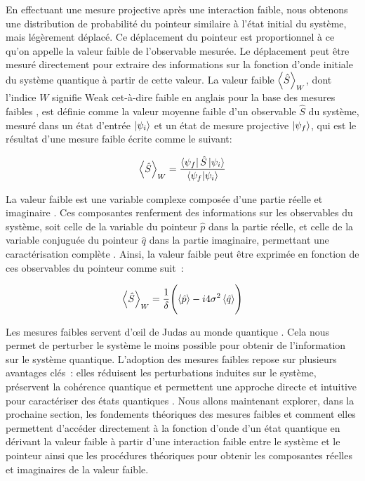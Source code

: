 \begin{onehalfspace}
    \noindent En effectuant une mesure projective après une interaction
    faible, nous obtenons une distribution de probabilité du pointeur similaire
    à l'état initial du système, mais légèrement déplacé.
    Ce déplacement du pointeur est proportionnel à ce qu'on appelle la 
    \guillemetleft \space valeur faible \guillemetright \space de l'observable mesurée.
    Le déplacement peut être mesuré directement pour extraire
    des informations sur la fonction d'onde initiale du système quantique
    à partir de cette valeur. La valeur faible $\expval{\hat{S}}_W$,
    dont l'indice $W$ signifie \guillemetleft Weak \guillemetright \space 
    cet-à-dire faible en anglais pour la base des
    mesures faibles \cite{Lundeen_Resch}, est définie
    comme la valeur moyenne faible d’un observable $\hat{S}$ du système,
    mesuré dans un état d’entrée $\ket{\psi_i}$ et un état de mesure
    projective $\ket{\psi_f}$, qui est le résultat d’une mesure faible écrite comme le suivant:


    \begin{equation}
        \expval{\hat{S}}_W = \frac{\bra{\psi_f}\hat{S}\ket{\psi_i}}{\bra{\psi_f}\ket{\psi_i}}        
    \end{equation}
        
    
    \noindent La valeur faible est une variable complexe composée d'une partie
    réelle et imaginaire \cite{Aharonov,Lundeen_Resch}. Ces composantes renferment des
    informations sur les observables du système, soit celle de la variable du pointeur $\hat{p}$ dans la partie réelle,
    et celle de la variable conjuguée du pointeur $\hat{q}$ dans la partie imaginaire,
    permettant une caractérisation complète \cite{Lundeen_Bamber}.
    Ainsi, la valeur faible peut être exprimée en fonction de ces 
    observables du pointeur comme suit :

    \begin{equation}
        \expval{\hat{S}}_W = \frac{1}{\delta}\Biggl( \expval{\hat{p}} - i4\sigma^2 \expval{\hat{q}} \Biggr)\label{eq:weakvalue_components}
    \end{equation}

    \noindent Les mesures faibles servent d’œil de Judas au monde 
    quantique \cite{Peephole}. Cela nous permet de perturber le système le 
    moins possible pour obtenir de l’information sur le système quantique. 
    L’adoption des mesures faibles repose sur plusieurs avantages clés : 
    elles réduisent les perturbations induites sur le système, préservent 
    la cohérence quantique et permettent une approche directe et 
    intuitive pour caractériser des états quantiques \cite{ApplicationWeak}.
    Nous allons maintenant explorer, dans la prochaine section, les fondements théoriques des 
    mesures faibles et comment elles permettent d’accéder directement à 
    la fonction d’onde d’un état quantique en dérivant la valeur faible
    à partir d’une interaction faible entre le système et le pointeur ainsi
    que les procédures théoriques pour obtenir les composantes réelles et
    imaginaires de la valeur faible.

\end{onehalfspace}

